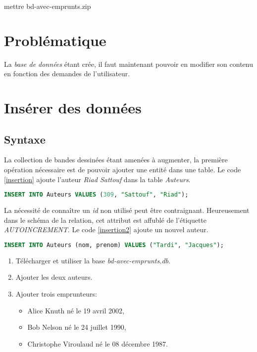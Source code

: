 \documentclass[a4paper,11pt]{article}
\begin{document}
\begin{Form}
\begin{commentprof}
mettre bd-avec-emprunts.zip
\end{commentprof}
\section{Problématique}
La \emph{base de données} étant crée, il faut maintenant pouvoir en modifier son contenu en fonction des demandes de l'utilisateur.
\begin{center}
\end{center}
\section{Insérer des données}
\subsection{Syntaxe}
La collection de bandes dessinées étant amenées à augmenter, la première opération nécessaire est de pouvoir ajouter une entité dans une table. Le code \ref{insertion} ajoute l'auteur \emph{Riad Sattouf} dans la table \emph{Auteurs}.
\begin{center}
\begin{lstlisting}[language=SQL]
INSERT INTO Auteurs VALUES (309, "Sattouf", "Riad");
\end{lstlisting}
\label{insertion}
\end{center}
La nécessité de connaître un \emph{id} non utilisé peut être contraignant. Heureusement dans le schéma de la relation, cet attribut est affublé de l'étiquette \emph{AUTOINCREMENT}. Le code \ref{insertion2} ajoute un nouvel auteur.
\begin{center}
\begin{lstlisting}[language=SQL]
INSERT INTO Auteurs (nom, prenom) VALUES ("Tardi", "Jacques");
\end{lstlisting}
\label{insertion2}
\end{center}
\begin{activite}
\begin{enumerate}
\item Télécharger et utiliser la base \emph{bd-avec-emprunts.db}.
\item Ajouter les deux auteurs.
\item Ajouter trois emprunteurs:
\begin{itemize}
\item Alice Knuth né le 19 avril 2002, 
\item Bob Nelson né le 24 juillet 1990,
\item Christophe Viroulaud né le 08 décembre 1987.
\end{itemize}
\end{enumerate}
\end{activite}

\end{Form}
\end{document}

